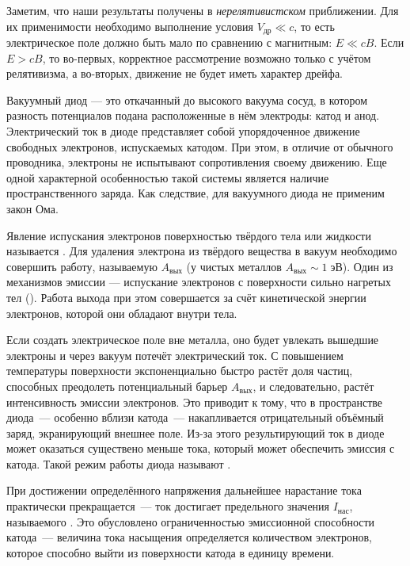 \begin{lab:note}
Заметим, что наши результаты получены в \emph{нерелятивистском}
приближении. Для их применимости необходимо выполнение условия $V_{др}\ll c$,
то есть электрическое поле должно быть мало по сравнению с магнитным: $E\ll cB$.
Если $E>cB$, то во-первых, корректное рассмотрение возможно только с учётом
релятивизма, а во-вторых, движение не будет иметь характер дрейфа.
\end{lab:note}


\label{sec:vac_di}

Вакуумный диод --- это откачанный до высокого вакуума сосуд,
в котором разность потенциалов подана расположенные в нём электроды:
катод и анод. Электрический ток в диоде представляет собой упорядоченное
движение свободных электронов, испускаемых катодом.  При этом,
в отличие от обычного проводника, электроны не испытывают сопротивления
своему движению. Еще одной характерной особенностью такой системы
является наличие пространственного заряда. Как следствие, для вакуумного
диода не применим закон Ома.

Явление испускания электронов поверхностью твёрдого тела или жидкости называется
. Для удаления электрона из твёрдого вещества в
вакуум необходимо совершить работу, называемую  $A_{вых}$
(у чистых металлов $A_{вых}\sim 1\;эВ$).
Один из механизмов эмиссии --- испускание электронов с поверхности сильно
нагретых тел (). Работа выхода при этом
совершается за счёт кинетической энергии электронов, которой они обладают
внутри тела.

Если создать электрическое поле вне металла, оно будет увлекать вышедшие
электроны и через вакуум потечёт электрический ток.
С повышением температуры поверхности экспоненциально быстро растёт доля частиц,
способных преодолеть потенциальный барьер $A_{вых}$, и следовательно, растёт
интенсивность эмиссии электронов. Это приводит к тому, что в пространстве
диода~--- особенно вблизи катода~--- накапливается отрицательный
объёмный заряд, экранирующий внешнее поле. Из-за этого результирующий ток
в диоде может оказаться существено меньше тока, который может обеспечить эмиссия
с катода. Такой режим работы диода называют .

При достижении определённого напряжения дальнейшее нарастание тока практически
прекращается~--- ток достигает предельного значения $I_{нас}$, называемого
. Это обусловлено ограниченностью эмиссионной способности
катода~--- величина тока насыщения определяется количеством электронов,
которое способно выйти из поверхности катода в единицу времени.

